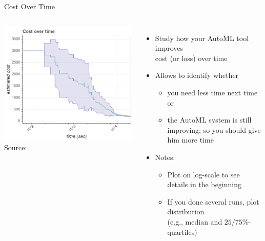 \begin{frame}[c]{Cost Over Time}

\begin{columns}

\begin{center}
	\includegraphics[width=1.0\textwidth]{images/overtime_plot.png}\\
	Source: 
\end{center}


\begin{itemize}
	\item Study how your AutoML tool improves\\ cost (or loss) over time
	\pause
	\item Allows to identify whether 
	\begin{itemize}
		\item you need less time next time or 
		\pause
		\item the AutoML system is still improving; so you should give him more time
	\end{itemize}
	\pause
	\item \alert{Notes}: 
	\begin{itemize}
		\item Plot on log-scale to see details in the beginning
		\item  If you done several runs, plot distribution\\ (e.g., median and $25/75\%$-quartiles)
	\end{itemize}
\end{itemize}
	
\end{columns}

\end{frame}

